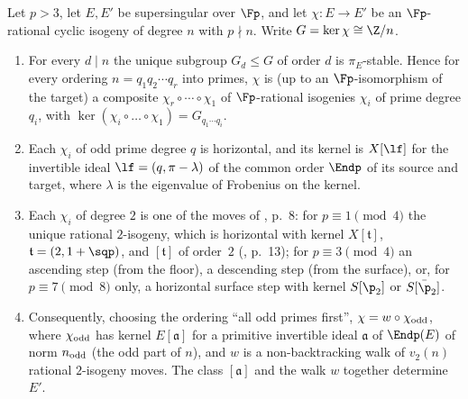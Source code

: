 \begin{proposition}\label{prop:factor}
Let $p>3$, let $E,E'$ be supersingular over $\Fp$, and let $\chi:E\to E'$ be an $\Fp$-rational cyclic isogeny of degree
$n$ with $p\nmid n$.  Write $G=\ker\chi\cong\Z/n$.
\begin{enumerate}[label=(\alph*)]
\item For every $d\mid n$ the unique subgroup $G_d\le G$ of order $d$ is $\pi_E$-stable.  Hence for every ordering
  $n=q_1q_2\cdots q_r$ into primes, $\chi$ is (up to an $\Fp$-isomorphism of the target) a composite
  $\chi_r\circ\cdots\circ\chi_1$ of $\Fp$-rational isogenies $\chi_i$ of prime degree $q_i$, with
  $\ker(\chi_i\circ\dots\circ\chi_1)=G_{q_1\cdots q_i}$.
\item Each $\chi_i$ of odd prime degree $q$ is horizontal, and its kernel is $X[\lf]$ for the invertible ideal
  $\lf=(q,\pi-\lambda)$ of the common order $\Endp$ of its source and target, where $\lambda$ is the eigenvalue of
  Frobenius on the kernel.
\item Each $\chi_i$ of degree $2$ is one of the moves of \cite[Thm.~2.7]{DG}, p.~8: for $p\equiv1\pmod4$ the unique rational
  $2$-isogeny, which is horizontal with kernel $X[\mathfrak t]$, $\mathfrak t=(2,1+\sqp)$, and $[\mathfrak t]$ of order~$2$
  (\cite[proof of Lemma~17]{CPV}, p.~13); for $p\equiv3\pmod4$ an ascending step (from the floor), a descending step
  (from the surface), or, for $p\equiv7\pmod8$ only, a horizontal surface step with kernel $S[\p_2]$ or $S[\bar\p_2]$.
\item Consequently, choosing the ordering ``all odd primes first'', $\chi=w\circ\chi_{\rm odd}$, where $\chi_{\rm odd}$ has
  kernel $E[\mathfrak a]$ for a primitive invertible ideal $\mathfrak a$ of $\Endp(E)$ of norm $n_{\rm odd}$ (the odd part of
  $n$), and $w$ is a non-backtracking walk of $v_2(n)$ rational $2$-isogeny moves.  The class $[\mathfrak a]$ and the walk
  $w$ together determine $E'$.
\end{enumerate}
\end{proposition}
